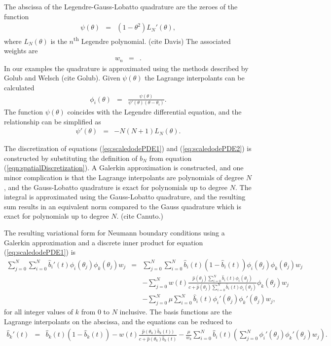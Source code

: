 \documentclass[12pt]{article}
\begin{document}
The abscissa of the Legendre-Gauss-Lobatto quadrature are the zeroes
of the function
\begin{eqnarray}
  \psi(\theta) & = & \left(1-\theta^2\right) L_{N}'(\theta),
\end{eqnarray}
where $L_N(\theta)$ is the $n$\textsuperscript{th} Legendre
polynomial. (cite Davis) The associated weights are
\begin{eqnarray}
  w_n & = & .
\end{eqnarray}
In our examples the quadrature is approximated using the methods
described by Golub and Welsch (cite Golub).  Given $\psi(\theta)$ the
Lagrange interpolants can be calculated
\begin{eqnarray}
  \phi_i(\theta) & = & \frac{\psi(\theta)}{\psi'(\theta)(\theta-\theta_i)}.
\end{eqnarray}
The function $\psi(\theta)$ coincides with the Legendre differential
equation, and the relationship can be simplified as
\begin{eqnarray}
  \psi'(\theta) & = & -N(N+1)L_N(\theta).
\end{eqnarray}

The discretization of equations (\ref{eq:scaledodePDE1}) and
(\ref{eq:scaledodePDE2}) is constructed by substituting the definition
of $b_N$ from equation (\ref{eqn:spatialDiscretization}). A Galerkin
approximation is constructed, and one minor complication is that the
Lagrange interpolants are polynomials of degree $N$, and the
Gauss-Lobatto quadrature is exact for polynomials up to degree
$N$. The integral is approximated using the Gauss-Lobatto quadrature,
and the resulting sum results in an equivalent norm compared to the
Gauss quadrature which is exact for polynomials up to degree
$N$. (cite Canuto.)

The resulting variational form for Neumann boundary conditions using a
Galerkin approximation and a discrete inner product for equation
(\ref{eq:scaledodePDE1}) is
\begin{eqnarray}
  \sum_{j=0}^N \sum_{i=0}^N  \hat{b}_i'(t) \phi_i(\theta_j) \phi_k(\theta_j) w_j
  & = &
  \sum_{j=0}^N \sum_{i=0}^N  \hat{b}_i(t) (1 - \hat{b}_i(t) ) \phi_i(\theta_j) \phi_k(\theta_j) w_j \\
  & &  -  \sum_{j=0}^N w(t) \frac{\hat{p}(\theta_j) \sum_{i=0}^N \hat{b}_i(t) \phi_i(\theta_j) }{c+\hat{p}(\theta_j) \sum_{i=0}^N \hat{b}_i(t) \phi_i(\theta_j)} \phi_k(\theta_j) w_j \nonumber \\ 
  & & - \sum_{j=0}^N \mu  \sum_{i=0}^N \hat{b}_i(t) \phi_i'(\theta_j) \phi_k'(\theta_j)  w_j, \nonumber
\end{eqnarray}
for all integer values of $k$ from $0$ to $N$ inclusive.  The basis
functions are the Lagrange interpolants on the abscissa, and the
equations can be reduced to
\begin{eqnarray}
  \hat{b}_k'(t) 
  & = &
  \hat{b}_k(t) (1 - \hat{b}_k(t) ) -  w(t) \frac{\hat{p}(\theta_k) \hat{b}_k(t)) }{c+\hat{p}(\theta_k)  \hat{b}_k(t) }  
   - \frac{\mu}{w_k} \sum_{i=0}^N \hat{b}_i(t) \left( \sum_{j=0}^N  \phi_i'(\theta_j) \phi_k'(\theta_j)  w_j \right). \nonumber
\end{eqnarray}
\end{document}
